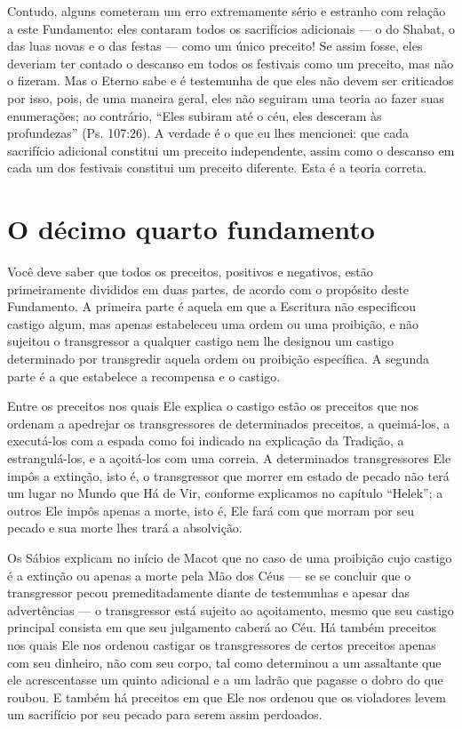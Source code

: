 Contudo, alguns cometeram um erro extremamente sério e estranho com
relação a este Fundamento: eles contaram todos os sacrifícios adicionais
--- o do Shabat, o das luas novas e o das festas --- como um único
preceito! Se assim fosse, eles deveriam ter contado o descanso em todos
os festivais como um preceito, mas não o fizeram. Mas o Eterno sabe e é
testemunha de que eles não devem ser criticados por isso, pois, de uma
maneira geral, eles não seguiram uma teoria ao fazer suas enumerações;
ao contrário, ``Eles subiram até o céu, eles desceram às profundezas''
(Ps. 107:26). A verdade é o que eu lhes mencionei: que cada sacrifício
adicional constitui um preceito independente, assim como o descanso em
cada um dos festivais constitui um preceito diferente. Esta é a teoria
correta.

\chapter*{O décimo quarto fundamento}

Você deve saber que todos os preceitos, positivos e negativos, estão
primeiramente divididos em duas partes, de acordo com o propósito deste
Fundamento. A primeira parte é aquela em que a Escritura não
especificou castigo algum, mas apenas estabeleceu uma ordem ou uma
proibição, e não sujeitou o transgressor a qualquer castigo nem lhe
designou um castigo determinado por transgredir aquela ordem ou
proibição específica. A segunda parte é a que estabelece a recompensa e
o castigo.

Entre os preceitos nos quais Ele explica o castigo estão os preceitos
que nos ordenam a apedrejar os transgressores de determinados preceitos,
a queimá-los, a executá-los com a espada como foi indicado na explicação
da Tradição, a estrangulá-los, e a açoitá-los com uma correia. A
determinados transgressores Ele impôs a extinção, isto é, o
transgressor que morrer em estado de pecado não terá um lugar no Mundo
que Há de Vir, conforme explicamos no capítulo ``Helek''; a outros Ele
impôs apenas a morte, isto é, Ele fará com que morram por seu pecado e
sua morte lhes trará a absolvição.

Os Sábios explicam no início de Macot que no caso de uma proibição cujo
castigo é a extinção ou apenas a morte pela Mão dos Céus --- se se
concluir que o transgressor pecou premeditadamente diante de testemunhas
e apesar das advertências --- o transgressor está sujeito ao
açoitamento, mesmo que seu castigo principal consista em que seu
julgamento caberá ao Céu. Há também preceitos nos quais Ele nos ordenou
castigar os transgressores de certos preceitos apenas com seu dinheiro,
não com seu corpo, tal como determinou a um assaltante que ele acrescentasse um quinto adicional e a um
ladrão que pagasse o dobro do que roubou. E também há preceitos em que
Ele nos ordenou que os violadores levem um sacrifício por seu pecado
para serem assim perdoados.

